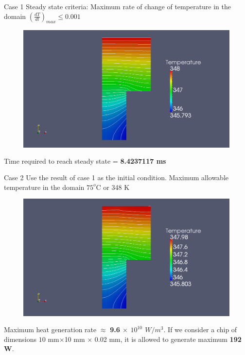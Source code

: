 \documentclass[t,english]{beamer}
\begin{document}
\begin{frame}{Case 1}
{\small Steady state criteria: Maximum rate of change of temperature in the domain $\left(\frac{dT}{dt}\right)_{max} \leq 0.001$}
\begin{figure}[!htb]
\centering
\includegraphics[scale=0.15]{./case1_c.png}
\end{figure}
Time required to reach steady state = \textbf{8.4237117 ms}
\end{frame}

\begin{frame}{Case 2}
{\small Use the result of case 1 as the initial condition. Maximum allowable temperature in the domain $75^o$C or 348 K}
\begin{figure}[!htb]
\centering
\includegraphics[trim=0 60 0 70,scale=0.15]{./case2_c.png}
\end{figure}
Maximum heat generation rate $\approx$ \textbf{9.6 $\times$ $10^{10}$ $W/m^3$}. 
If we consider a chip of dimensions $10$ mm$\times$10 mm $\times$ 0.02 mm, it is allowed to generate maximum \textbf{192 W}.
\end{frame}
\end{document}
